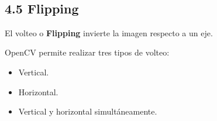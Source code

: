 \documentclass[11pt]{article}
\providecommand{\tightlist}{%
      \setlength{\itemsep}{0pt}\setlength{\parskip}{0pt}}
\begin{document}
    \begin{center}
    \end{center}
    { \hspace*{\fill} \\}
    
    \subsection{4.5 Flipping}\label{flipping}

El volteo o \textbf{Flipping} invierte la imagen respecto a un eje.

OpenCV permite realizar tres tipos de volteo:

\begin{itemize}
\tightlist
\item
  Vertical.
\item
  Horizontal.
\item
  Vertical y horizontal simultáneamente.
\end{itemize}
\end{document}
